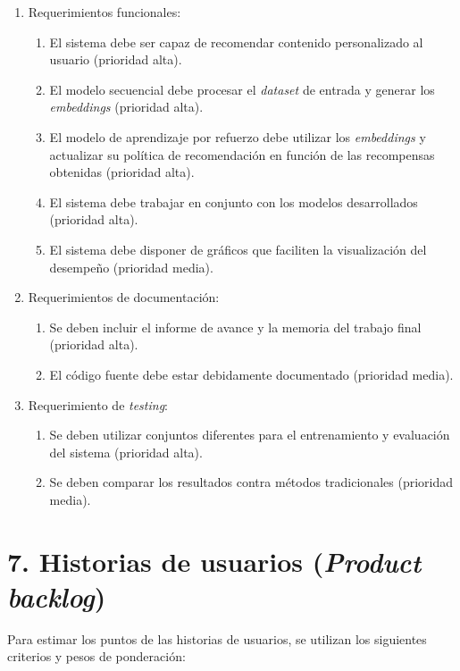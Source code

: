 \documentclass[
11pt, %
]{charter}
\begin{document}
\begin{enumerate}
	\item Requerimientos funcionales:
		\begin{enumerate}
			\item El sistema debe ser capaz de recomendar contenido personalizado al usuario (prioridad alta).
			\item El modelo secuencial debe procesar el \textit{dataset} de entrada y generar los \textit{embeddings} (prioridad alta).
			\item El modelo de aprendizaje por refuerzo debe utilizar los \textit{embeddings} y actualizar su política de recomendación en función de las recompensas obtenidas (prioridad alta).
			\item El sistema debe trabajar en conjunto con los modelos desarrollados (prioridad alta).
			\item El sistema debe disponer de gráficos que faciliten la visualización del desempeño (prioridad media).
		\end{enumerate}
	\item Requerimientos de documentación:
		\begin{enumerate}
			\item Se deben incluir el informe de avance y la memoria del trabajo final (prioridad alta).
			\item El código fuente debe estar debidamente documentado (prioridad media).
		\end{enumerate}
	\item Requerimiento de \textit{testing}:
		\begin{enumerate}
			\item Se deben utilizar conjuntos diferentes para el entrenamiento y evaluación del sistema (prioridad alta).
			\item Se deben comparar los resultados contra métodos tradicionales (prioridad media).
		\end{enumerate}
\end{enumerate}


\section{7. Historias de usuarios (\textit{Product backlog})}
\label{sec:backlog}

Para estimar los puntos de las historias de usuarios, se utilizan los siguientes criterios y pesos de ponderación:
\end{document}
